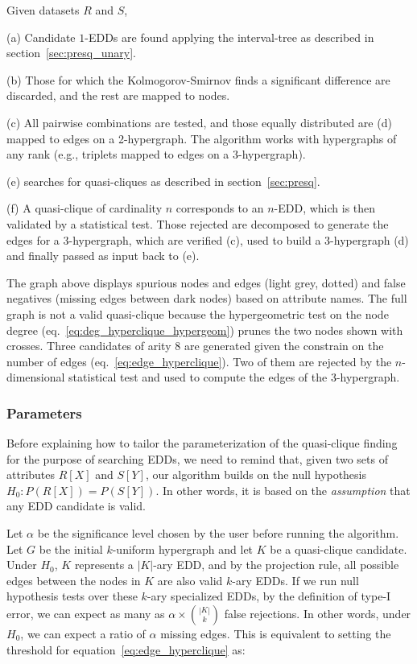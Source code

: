 \begin{multicols}{2}
 Given datasets $R$ and $S$,

(a) Candidate $1$-\glspl{EDD} are found applying the interval-tree as described in section~\ref{sec:presq_unary}.

(b) Those for which the Kolmogorov-Smirnov finds a significant difference are discarded,
    and the rest are mapped to nodes.

(c) All pairwise combinations are tested, and those equally distributed are
    (d) mapped to edges on a 2-hypergraph. The algorithm works with hypergraphs of any rank
    (e.g., triplets mapped to edges on a 3-hypergraph).
    
(e) \PresQ searches for quasi-cliques as described in section~\ref{sec:presq}.

(f) A quasi-clique of cardinality $n$ corresponds to an $n$-EDD, which is then validated by
a statistical test. Those rejected are decomposed to generate the edges for a 3-hypergraph, which are
verified (c), used to build a $3$-hypergraph (d) and finally passed as input back to (e).

The graph above displays spurious nodes and edges (light grey, dotted) and false negatives
(missing edges between dark nodes) based on attribute names. The full graph is not a valid
quasi-clique because the hypergeometric
test on the node degree (eq.~\ref{eq:deg_hyperclique_hypergeom}) prunes the two nodes shown with
crosses.
Three candidates of arity 8 are generated given the constrain on the number of edges 
(eq.~\ref{eq:edge_hyperclique}). Two of them are rejected by the $n$-dimensional statistical test and used to compute the edges of the $3$-hypergraph.

\end{multicols}
    
\newpage

\subsubsection{Parameters}

Before explaining how to tailor the parameterization of the quasi-clique finding for the purpose
of searching \glspl{EDD}, we need to remind that, given two sets of attributes $R[X]$ and $S[Y]$,
our algorithm builds on the null hypothesis $H_0: P(R[X]) = P(S[Y])$.
In other words, it is based on the \emph{assumption} that any \gls{EDD} candidate is valid.

Let $\alpha$ be the significance level chosen by the user before running the algorithm.
Let $G$ be the initial $k$-uniform hypergraph and let $K$ be a quasi-clique candidate.
Under $H_0$, $K$ represents a $|K|$-ary EDD, and by the projection rule,
all possible edges between the nodes in $K$ are also valid $k$-ary \glspl{EDD}.
If we run null hypothesis tests over these $k$-ary specialized \glspl{EDD},
by the definition of type-I error, we can expect as many as $\alpha \times \binom{|K|}{k}$ false rejections.
In other words, under $H_0$, we can expect a ratio of $\alpha$ missing edges.
This is equivalent to setting the threshold for equation~\ref{eq:edge_hyperclique} as:

